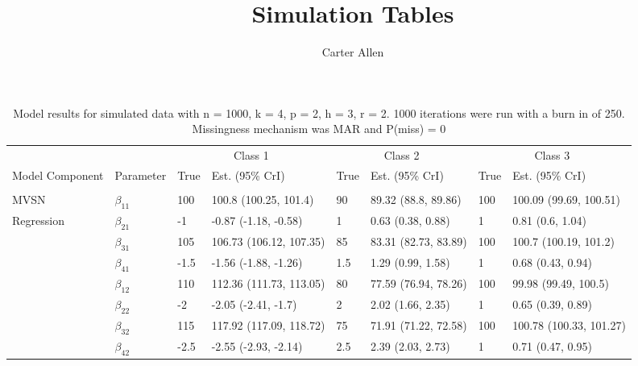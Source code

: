 \documentclass[]{article}
\title{Simulation Tables}
\author{Carter Allen}
\date{}
\begin{document}
\maketitle

\begin{table}[t]

\caption{\label{tab:unnamed-chunk-5}Model results for simulated data with n = 1000, k = 4, p = 2, h = 3, r = 2. 1000 iterations were run with a burn in of 250. Missingness mechanism was MAR and P(miss) = 0}
\centering
\fontsize{8}{10}\selectfont
\begin{tabular}{llllllll}
\toprule
\multicolumn{2}{c}{ } & \multicolumn{2}{c}{Class 1} & \multicolumn{2}{c}{Class 2} & \multicolumn{2}{c}{Class 3} \\
\cmidrule(l{3pt}r{3pt}){3-4} \cmidrule(l{3pt}r{3pt}){5-6} \cmidrule(l{3pt}r{3pt}){7-8}
Model Component & Parameter & True & Est. (95\% CrI) & True & Est. (95\% CrI) & True & Est. (95\% CrI)\\
\midrule
\addlinespace[0.3em]
\multicolumn{8}{l}{\textbf{ }}\\
\hspace{1em}MVSN & $\beta_{11}$ & 100 & 100.8 (100.25, 101.4) & 90 & 89.32 (88.8, 89.86) & 100 & 100.09 (99.69, 100.51)\\
\hspace{1em}Regression & $\beta_{21}$ & -1 & -0.87 (-1.18, -0.58) & 1 & 0.63 (0.38, 0.88) & 1 & 0.81 (0.6, 1.04)\\
\hspace{1em} & $\beta_{31}$ & 105 & 106.73 (106.12, 107.35) & 85 & 83.31 (82.73, 83.89) & 100 & 100.7 (100.19, 101.2)\\
\hspace{1em} & $\beta_{41}$ & -1.5 & -1.56 (-1.88, -1.26) & 1.5 & 1.29 (0.99, 1.58) & 1 & 0.68 (0.43, 0.94)\\
\hspace{1em} & $\beta_{12}$ & 110 & 112.36 (111.73, 113.05) & 80 & 77.59 (76.94, 78.26) & 100 & 99.98 (99.49, 100.5)\\
\hspace{1em} & $\beta_{22}$ & -2 & -2.05 (-2.41, -1.7) & 2 & 2.02 (1.66, 2.35) & 1 & 0.65 (0.39, 0.89)\\
\hspace{1em} & $\beta_{32}$ & 115 & 117.92 (117.09, 118.72) & 75 & 71.91 (71.22, 72.58) & 100 & 100.78 (100.33, 101.27)\\
\hspace{1em} & $\beta_{42}$ & -2.5 & -2.55 (-2.93, -2.14) & 2.5 & 2.39 (2.03, 2.73) & 1 & 0.71 (0.47, 0.95)\\

\end{tabular}
\end{table}
\end{document}
